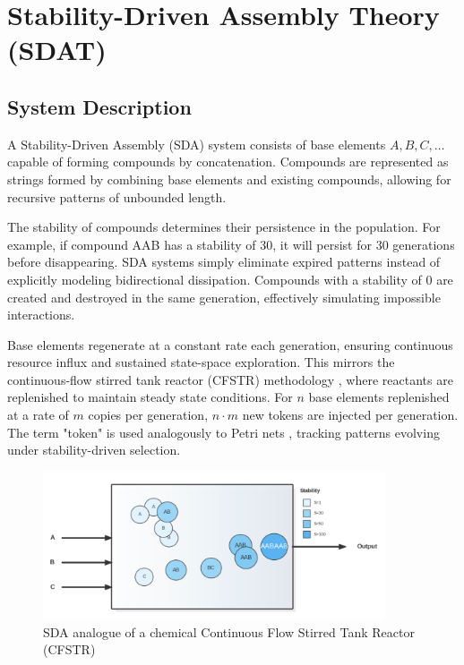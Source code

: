 \documentclass[preprint,12pt]{elsarticle}
\begin{document}
\section{Stability-Driven Assembly Theory (SDAT)}

\subsection{System Description}

A Stability-Driven Assembly (SDA) system consists of base elements \( A, B, C, \dots \) capable of forming compounds by concatenation. Compounds are represented as strings formed by combining base elements and existing compounds, allowing for recursive patterns of unbounded length.

The stability of compounds determines their persistence in the population. For example, if compound AAB has a stability of 30, it will persist for 30 generations before disappearing. SDA systems simply eliminate expired patterns instead of explicitly modeling bidirectional dissipation. Compounds with a stability of 0 are created and destroyed in the same generation, effectively simulating impossible interactions.

Base elements regenerate at a constant rate each generation, ensuring continuous resource influx and sustained state-space exploration. This mirrors the continuous-flow stirred tank reactor (CFSTR) methodology \cite{fogler1999chemical}, where reactants are replenished to maintain steady state conditions. For \( n \) base elements replenished at a rate of \( m \) copies per generation, \( n \cdot m \) new tokens are injected per generation. The term "token" is used analogously to Petri nets \cite{petri1962communication}, tracking patterns evolving under stability-driven selection.

\begin{figure}[htp]
    \centering
    \includegraphics[width=0.9\textwidth]{figure_1}
    \caption{SDA analogue of a chemical Continuous Flow Stirred Tank Reactor (CFSTR)}
    \label{fig:figure_1}
\end{figure}
\end{document}
